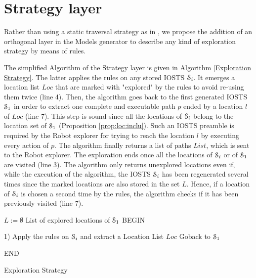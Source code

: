 
\section{Strategy layer}
\label{sec:modelinf:webapps:strategy}


Rather than using a static traversal strategy as in
\cite{Memon:2003,concolicandroid12,crawljax:tweb12,
Amalfitano:2012:UGR:2351676.2351717, WPX13}, we propose the
addition of an orthogonal layer in the Models generator to
describe any kind of exploration strategy by means of rules.

The simplified Algorithm of the Strategy layer is given in
Algorithm \ref{Exploration Strategy}. The latter applies the
rules on any stored IOSTS $\EuScript{S}_i$. It emerges a
location list $Loc$ that are marked with "explored" by the rules
to avoid re-using them twice (line 4). Then, the algorithm goes
back to the first generated IOSTS $\EuScript{S}_1$ in order to
extract one complete and executable path $p$ ended by a location
$l$ of $Loc$ (line 7). This step is sound since all the locations
of $\EuScript{S}_i$ belong to the location set of
$\EuScript{S}_1$ (Proposition \ref{prop:loc:inclu}). Such an
IOSTS preamble is required by the Robot explorer for trying to
reach the location $l$ by executing every action of $p$. The
algorithm finally returns a list of paths $List$, which is sent
to the Robot explorer. The exploration ends once all the
locations of $\EuScript{S}_i$ or of $\EuScript{S}_1$ are visited
(line 3). The algorithm only returns unexplored locations even
if, while the execution of the algorithm, the IOSTS
$\EuScript{S}_i$ has been regenerated several times since the
marked locations are also stored in the set $L$. Hence, if a
location of $\EuScript{S}_i$ is chosen a second time by the
rules, the algorithm checks if it has been previously visited
(line 7).

\begin{algorithm}
 


$L:=\emptyset$ List of explored locations of $\EuScript{S}_1$\;
BEGIN\;
{
1) Apply the rules on $\EuScript{S}_i$ and extract a  Location List $Loc$\;
Goback to $\EuScript{S}_1$\;

}
END\;

\caption{Exploration Strategy}
 \label{Exploration Strategy}
\end{algorithm}


